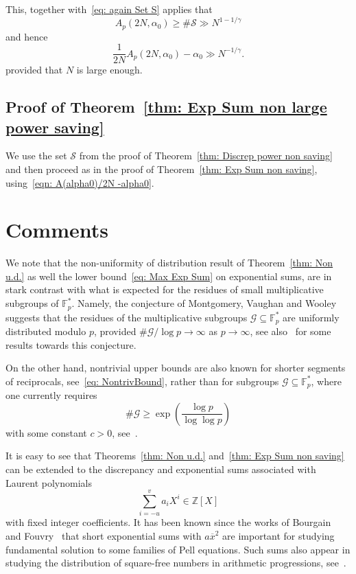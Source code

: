 \documentclass[12pt]{amsart}
\numberwithin{equation}{section}
\numberwithin{theorem}{section}
\numberwithin{table}{section}
\numberwithin{figure}{section}
\def\cG{{\mathcal G}}
\def\cS{{\mathcal S}}
\def\ge{\geqslant}
\def\xbar{\overline{x}}
\def \F{\mathbb{F}}
\def \Z{\mathbb{Z}}
\def \Z{\mathbb{Z}}
\def\({\left(}
\def\){\right)}
\begin{document}
This, together with~\eqref{eq: again Set S} applies that 
$$
A_p(2N, \alpha_0)  \ge \# \cS \gg N^{1-1/\gamma}
$$
and hence 
\begin{equation}
\label{eqn: A(alpha0)/2N -alpha0}
 \frac{1}{2N}  A_p(2N, \alpha_0) - \alpha_0 \gg N^{-1/\gamma}.
\end{equation}
provided that $N$ is large enough. 


\subsection{Proof of Theorem~\ref{thm: Exp Sum non large power saving}}
We use the set $\cS$ from the proof of Theorem~\ref{thm: Discrep power non saving}
and then proceed as in the proof of Theorem~\ref{thm: Exp Sum non saving},
using~\eqref{eqn: A(alpha0)/2N -alpha0}. 



\section{Comments} 

We note that the non-uniformity of distribution result of Theorem~\ref{thm: Non u.d.}  
as well  the lower bound~\eqref{eq: Max Exp Sum} on exponential sums, are in stark contrast 
with what is expected for the residues of small multiplicative subgroups of $\F_p^*$.
Namely,   the conjecture of Montgomery,   Vaughan and  Wooley~\cite{MontVW}
suggests that the residues of the multiplicative subgroups   $\cG \subseteq \F_p^*$ are 
uniformly distributed modulo $p$, provided $\#\cG/\log p \to \infty$ as $p\to \infty$, see also~\cite{Bour1, Bour2}
for some  results  towards this conjecture. 

On the other hand, nontrivial upper bounds are also known for shorter segments 
of reciprocals, see~\eqref{eq: NontrivBound}, rather than for subgroups   $\cG \subseteq \F_p^*$, 
where one currently requires 
$$
\# \cG \ge \exp\(\frac{\log p}{\log \log p}\)
$$
with some constant $c>0$, see~\cite{Bour2}.

It is easy to see that   Theorems~\ref{thm: Non u.d.}  and~\ref{thm: Exp Sum non saving} 
can be extended to the discrepancy  and exponential sums associated with Laurent polynomials
$$
 \sum_{i=-u}^v a_i X^i \in \Z[X]
$$
with fixed integer coefficients.  It has been known since the works of Bourgain~\cite{Bour3} and
Fouvry~\cite{Fou} that short exponential sums with $a\xbar^2$ are important for studying 
fundamental solution to some families of Pell equations. Such sums also appear in 
studying the distribution of square-free numbers in arithmetic progressions, see~\cite{Nun}. 
\end{document}
